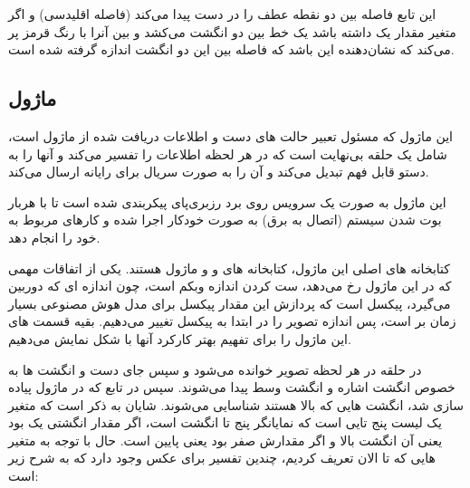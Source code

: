 \documentclass{article}
\begin{document}
این تابع فاصله بین دو نقطه عطف را در دست پیدا می‌کند (فاصله اقلیدسی) و اگر متغیر 
مقدار یک داشته باشد یک خط بین دو انگشت می‌کشد و بین آنرا با رنگ قرمز پر می‌کند که نشان‌دهنده این باشد که فاصله بین این دو انگشت اندازه گرفته شده است.

\subsection{ماژول }
این ماژول که مسئول تعبیر حالت های دست و اطلاعات دریافت شده از ماژول  است، شامل یک حلقه  بی‌نهایت است که در هر لحظه اطلاعات را تفسیر می‌کند و آنها را به دستو قابل فهم تبدیل می‌کند و آن را به صورت سریال برای رایانه ارسال می‌کند.

این ماژول به صورت یک سرویس روی برد رزبری‌پای پیکربندی شده است تا با هربار بوت شدن سیستم (اتصال به برق) به صورت خودکار اجرا شده و کارهای مربوط به خود را انجام دهد.

کتابخانه های اصلی این ماژول، کتابخانه های  و  و ماژول  هستند. یکی از اتفاقات مهمی که در این ماژول رخ می‌دهد، ست کردن اندازه وبکم است، چون اندازه ای که دوربین می‌گیرد،  پیکسل است که پردازش این مقدار پیکسل برای مدل هوش مصنوعی بسیار زمان بر است، پس اندازه تصویر را در ابتدا به  پیکسل تغییر می‌دهیم. بقیه قسمت های این ماژول را برای تفهیم بهتر کارکرد آنها با شکل نمایش می‌دهیم.

در حلقه در هر لحظه تصویر خوانده می‌شود و سپس جای دست و انگشت ها به خصوص انگشت اشاره و انگشت وسط پیدا می‌شوند. سپس در تابع  که در ماژول  پیاده سازی شد، انگشت هایی که بالا هستند شناسایی می‌شوند. شایان به ذکر است که متغیر  یک لیست پنج تایی است که نمایانگر پنج تا انگشت است، اگر مقدار انگشتی یک بود یعنی آن انگشت بالا و اگر مقدارش صفر بود یعنی پایین است. حال با توجه به متغیر هایی که تا الان تعریف کردیم، چندین تفسیر برای عکس وجود دارد که به شرح زیر است:
\end{document}
